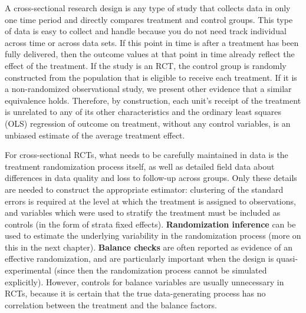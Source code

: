 A cross-sectional research design is any type of study
that collects data in only one time period
and directly compares treatment and control groups.
This type of data is easy to collect and handle because
you do not need track individual across time or across data sets.
If this point in time is after a treatment has been fully delivered,
then the outcome values at that point in time
already reflect the effect of the treatment.
If the study is an RCT, the control group is randomly constructed
from the population that is eligible to receive each treatment.
If it is a non-randomized observational study, we present other evidence that a similar equivalence holds.
Therefore, by construction, each unit's receipt of the treatment
is unrelated to any of its other characteristics
and the ordinary least squares (OLS) regression
of outcome on treatment, without any control variables,
is an unbiased estimate of the average treatment effect.

For cross-sectional RCTs, what needs to be carefully maintained in data
is the treatment randomization process itself,
as well as detailed field data about differences
in data quality and loss to follow-up across groups.\cite{athey2017econometrics}
Only these details are needed to construct the appropriate estimator:
clustering of the standard errors is required at the level
at which the treatment is assigned to observations,
and variables which were used to stratify the treatment
must be included as controls (in the form of strata fixed effects).
\textbf{Randomization inference} can be used
to estimate the underlying variability in the randomization process
(more on this in the next chapter).
\textbf{Balance checks}
are often reported as evidence of an effective randomization,
and are particularly important when the design is quasi-experimental
(since then the randomization process cannot be simulated explicitly).
However, controls for balance variables are usually unnecessary in RCTs,
because it is certain that the true data-generating process
has no correlation between the treatment and the balance factors.

